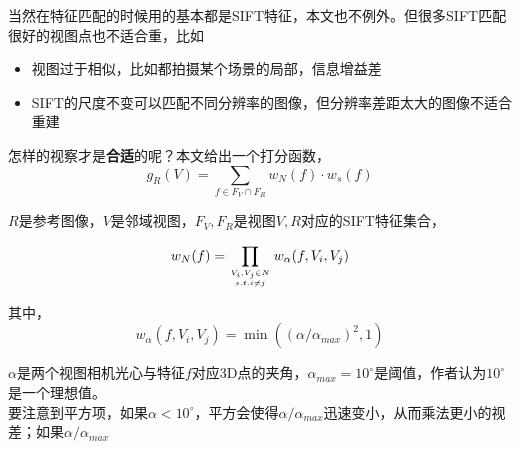 \documentclass[hpyerref,UTF8,a4paper,titlepage,12pt,oneside]{ctexbook}
\theoremstyle{definition}
\begin{document}
	当然在特征匹配的时候用的基本都是SIFT特征，本文也不例外。但很多SIFT匹配很好的视图点也不适合重，比如
	\begin{itemize}
		\item 视图过于相似，比如都拍摄某个场景的局部，信息增益差
		\item SIFT的尺度不变可以匹配不同分辨率的图像，但分辨率差距太大的图像不适合重建
	\end{itemize}

	怎样的视察才是\textbf{合适}的呢？本文给出一个打分函数，
	$$
		g_R(V) = \sum_{f\in F_V \cap F_R}w_N(f)\cdot w_s(f)
	$$

	$R$是参考图像，$V$是邻域视图，$F_V,F_R$是视图$V,R$对应的SIFT特征集合，

	$$
		w_N(f) = \prod_{V_i,V_j\in N\atop s.t. i\ne j}w_\alpha(f,V_i,V_j)
	$$

	其中，
	$$
		w_\alpha(f,V_i,V_j) =\min((\alpha/\alpha_{max})^2,1)
	$$

	$\alpha$是两个视图相机光心与特征$f$对应3D点的夹角，$\alpha_{max} = 10^\circ$是阈值，作者认为$10^\circ$是一个理想值。\\

	要注意到平方项，如果$\alpha < 10^\circ$，平方会使得$\alpha/\alpha_{max}$迅速变小，从而乘法更小的视差；如果$\alpha/\alpha_{max}$


\end{document}
